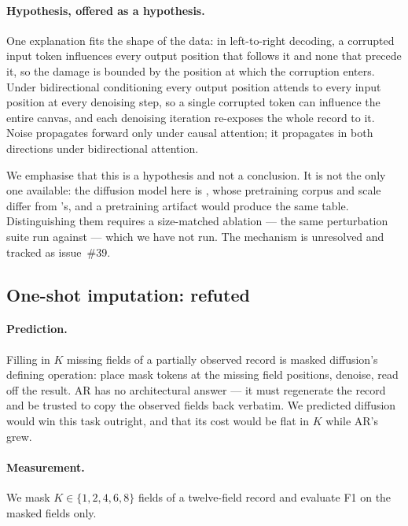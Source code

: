 \paragraph{Hypothesis, offered as a hypothesis.} One explanation fits the shape
of the data: in left-to-right decoding, a corrupted input token influences every
output position that follows it and none that precede it, so the damage is
bounded by the position at which the corruption enters. Under bidirectional
conditioning every output position attends to every input position at every
denoising step, so a single corrupted token can influence the entire canvas, and
each denoising iteration re-exposes the whole record to it. Noise propagates
forward only under causal attention; it propagates in both directions under
bidirectional attention.

We emphasise that this is a hypothesis and not a conclusion. It is not the only
one available: the diffusion model here is \modelLLaDA{}, whose pretraining
corpus and scale differ from \modelARthree{}'s, and a pretraining artifact would
produce the same table. Distinguishing them requires a size-matched ablation ---
the same perturbation suite run against \modelDG{} --- which we have not run.
The mechanism is unresolved and tracked as issue~\#39. 

\subsection{One-shot imputation: refuted}
\label{sec:neg-impute}

\paragraph{Prediction.} Filling in $K$ missing fields of a partially observed
record is masked diffusion's defining operation: place mask tokens at the
missing field positions, denoise, read off the result. AR has no architectural
answer --- it must regenerate the record and be trusted to copy the observed
fields back verbatim. We predicted diffusion would win this task outright, and
that its cost would be flat in $K$ while AR's grew.

\paragraph{Measurement.} We mask $K \in \{1,2,4,6,8\}$ fields of a
twelve-field record and evaluate F1 on the masked fields only.

